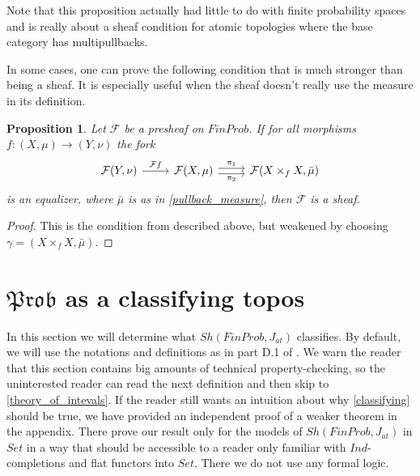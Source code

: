 \documentclass[a4paper]{amsproc}
\theoremstyle{plain}
\newtheorem{proposition}[theorem]{Proposition}
\theoremstyle{definition}
\theoremstyle{remark}
\numberwithin{equation}{section}
\begin{document}
Note that this proposition actually had little to do with finite probability spaces and is really about a sheaf condition for atomic topologies where the base category has multipullbacks.

In some cases, one can prove the following condition that is much stronger than being a sheaf. It is especially useful when the sheaf doesn't really use the measure in its definition.

\begin{proposition} \label{sheaf_condition_weak}
Let $\mathcal{F}$ be a presheaf on $FinProb$. If for all morphisms $f: (X,\mu) \to (Y,\nu)$ the fork
\[
\begin{tikzcd} \mathcal{F} (Y,\nu) \arrow[r, "\mathcal{F}f"] & \mathcal{F} (X,\mu) \arrow[r, "\pi_1", shift left] \arrow[r, "\pi_2"', shift right] & \mathcal{F} (X \times_f X,\bar{\mu})
\end{tikzcd}
\]
is an equalizer, where $\bar{\mu}$ is as in \ref{pullback_measure}, then $\mathcal{F}$ is a sheaf.
\end{proposition}
\begin{proof}
This is the condition from \cite{sheaves_geometry_logic} described above, but weakened by choosing $\gamma = (X \times_f X,\bar{\mu})$.
\end{proof}

\section{$\mathfrak{Prob}$ as a classifying topos}

In this section we will determine what $Sh(FinProb, J_{at})$ classifies. By default, we will use the notations and definitions as in part D.1 of \cite{elephant}. We warn the reader that this section contains big amounts of technical property-checking, so the uninterested reader can read the next definition and then skip to \ref{theory_of_intevals}. If the reader still wants an intuition about why \ref{classifying} should be true, we have provided an independent proof of a weaker theorem in the appendix. There prove our result only for the models of $Sh(FinProb, J_{at})$ in $Set$ in a way that should be accessible to a reader only familiar with $Ind$-completions and flat functors into $Set$. There we do not use any formal logic.
\end{document}
